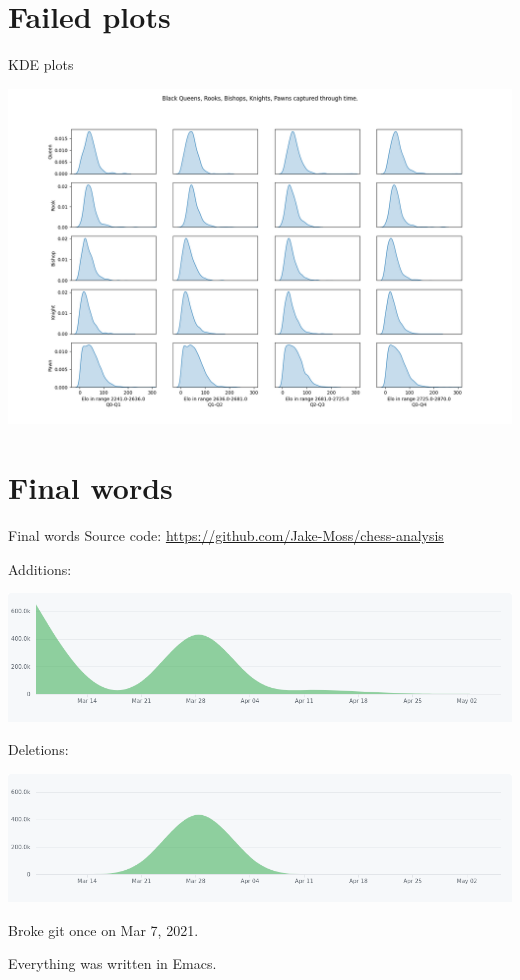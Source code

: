 \documentclass[presentation, 8pt]{beamer}
\begin{document}
\section{Failed plots}
\label{sec:orgd71e8c6}
\begin{frame}[label={sec:org17b5ade}]{KDE plots}
\begin{center}
\includegraphics[width=.9\linewidth]{Images/failed kde.png}
\end{center}
\end{frame}

\section{Final words}
\label{sec:org01bddf1}
\begin{frame}[label={sec:orgfc4cb1a}]{Final words}
Source code: \url{https://github.com/Jake-Moss/chess-analysis}

Additions:
\begin{center}
\includegraphics[width=.9\linewidth]{Images/Additions.png}
\end{center}
Deletions:
\begin{center}
\includegraphics[width=.9\linewidth]{Images/Deletions.png}
\end{center}

Broke git once on Mar 7, 2021.

Everything was written in Emacs.
\end{frame}
\end{document}
